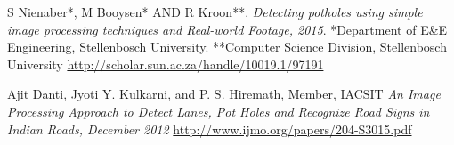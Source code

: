 \documentclass[12pt,a4paper]{article}
\begin{document}
\begin{thebibliography}{9}
S Nienaber*, M Booysen* AND R Kroon**.
\textit{Detecting potholes using simple image processing techniques and Real-world Footage, 2015}. 
*Department of E\&E Engineering, Stellenbosch University.
**Computer Science Division, Stellenbosch University
\url{http://scholar.sun.ac.za/handle/10019.1/97191}
 
Ajit Danti, Jyoti Y. Kulkarni, and P. S. Hiremath, Member, IACSIT
\textit{An Image Processing Approach to Detect Lanes, Pot Holes and Recognize Road Signs in Indian Roads, December 2012}
\url{http://www.ijmo.org/papers/204-S3015.pdf}
\end{thebibliography}
\end{document}
